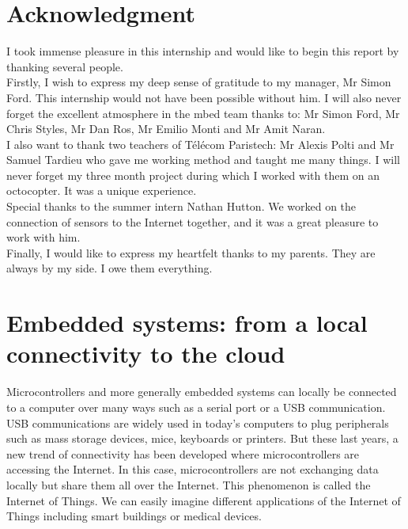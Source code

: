 \documentclass[pdftex,10pt,a4paper]{report}
\begin{document}



\chapter*{Acknowledgment}
I took immense pleasure in this internship and would like to begin this report by thanking several people. \\

Firstly, I wish to express my deep sense of gratitude to my manager, Mr Simon Ford. This internship would not have been possible without him. I will also never forget the excellent atmosphere in the mbed team thanks to: Mr Simon Ford, Mr Chris Styles, Mr Dan Ros, Mr Emilio Monti and Mr Amit Naran. \\

I also want to thank two teachers of T\'{e}l\'{e}com Paristech: Mr Alexis Polti and Mr Samuel Tardieu who gave me working method and taught me many things. I will never forget my three month project during which I worked with them on an octocopter. It was a unique experience. \\

Special thanks to the summer intern Nathan Hutton. We worked on the connection of sensors to the Internet together, and it was a great pleasure to work with him. \\

Finally, I would like to express my heartfelt thanks to my parents. They are always by my side. I owe them everything.

\chapter*{Embedded systems: from a local connectivity to the cloud}
Microcontrollers and more generally embedded systems can locally be connected to a computer over many ways such as a serial port or a USB communication. USB communications are widely used in today's computers to plug peripherals such as mass storage devices, mice, keyboards or printers. But these last years, a new trend of connectivity has been developed where microcontrollers are accessing the Internet. In this case, microcontrollers are not exchanging data locally but share them all over the Internet. This phenomenon is called the Internet of Things. We can easily imagine different applications of the Internet of Things including smart buildings or medical devices. \\
\end{document}

